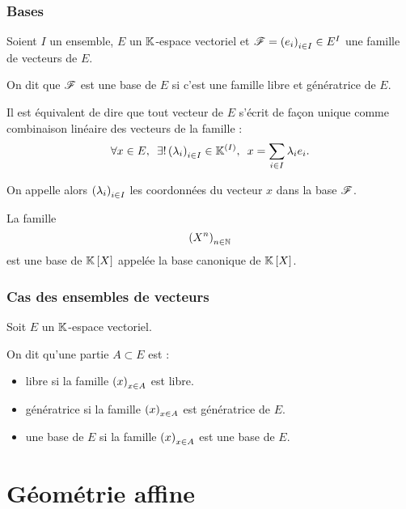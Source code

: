 \subsubsection{Bases}

\begin{defi}
Soient \(I\) un ensemble, \(E\) un \(\mathbb{K}\)-espace vectoriel et \(\mathscr{F}=\left(e_i\right)_{i\in I}\in E^I\) une famille de vecteurs de \(E\).

On dit que \(\mathscr{F}\) est une base de \(E\) si c'est une famille libre et génératrice de \(E\).

Il est équivalent de dire que tout vecteur de \(E\) s'écrit de façon unique comme combinaison linéaire des vecteurs de la famille : \[\quantifs{\forall x\in E;\exists!\paren{\lambda_i}_{i\in I}\in\K\deriv{I}}x=\sum_{i\in I}\lambda_ie_i.\]

On appelle alors \(\left(\lambda_i\right)_{i\in I}\) les coordonnées du vecteur \(x\) dans la base \(\mathscr{F}\).
\end{defi}

\begin{ex}
La famille \[\left(X^n\right)_{n\in\mathbb{N}}\] est une base de \(\poly\) appelée la base canonique de \(\poly\).
\end{ex}

\subsubsection{Cas des ensembles de vecteurs}

\begin{defi}
Soit \(E\) un \(\mathbb{K}\)-espace vectoriel.

On dit qu'une partie \(A\subset E\) est :

\begin{itemize}
\item libre si la famille \(\left(x\right)_{x\in A}\) est libre. \\

\item génératrice si la famille \(\left(x\right)_{x\in A}\) est génératrice de \(E\). \\

\item une base de \(E\) si la famille \(\left(x\right)_{x\in A}\) est une base de \(E\).
\end{itemize}
\end{defi}

\section{Géométrie affine}

